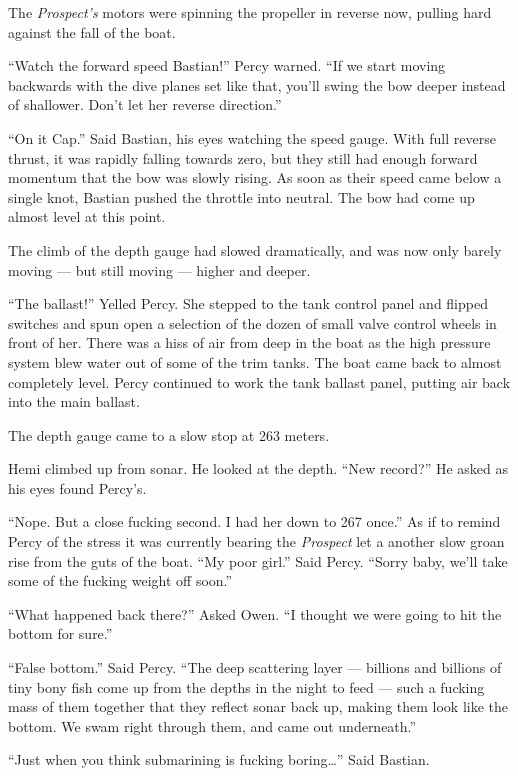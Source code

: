 \documentclass[]{scrbook}
\begin{document}
The \emph{Prospect's} motors were spinning the propeller in reverse now,
pulling hard against the fall of the boat.

``Watch the forward speed Bastian!'' Percy warned. ``If we start moving
backwards with the dive planes set like that, you'll swing the bow
deeper instead of shallower. Don't let her reverse direction.''

``On it Cap.'' Said Bastian, his eyes watching the speed gauge. With
full reverse thrust, it was rapidly falling towards zero, but they still
had enough forward momentum that the bow was slowly rising. As soon as
their speed came below a single knot, Bastian pushed the throttle into
neutral. The bow had come up almost level at this point.

The climb of the depth gauge had slowed dramatically, and was now only
barely moving --- but still moving --- higher and deeper.

``The ballast!'' Yelled Percy. She stepped to the tank control panel and
flipped switches and spun open a selection of the dozen of small valve
control wheels in front of her. There was a hiss of air from deep in the
boat as the high pressure system blew water out of some of the trim
tanks. The boat came back to almost completely level. Percy continued to
work the tank ballast panel, putting air back into the main ballast.

The depth gauge came to a slow stop at 263 meters.

Hemi climbed up from sonar. He looked at the depth. ``New record?'' He
asked as his eyes found Percy's.

``Nope. But a close fucking second. I had her down to 267 once.'' As if
to remind Percy of the stress it was currently bearing the
\emph{Prospect} let a another slow groan rise from the guts of the boat.
``My poor girl.'' Said Percy. ``Sorry baby, we'll take some of the
fucking weight off soon.''

``What happened back there?'' Asked Owen. ``I thought we were going to
hit the bottom for sure.''

``False bottom.'' Said Percy. ``The deep scattering layer --- billions
and billions of tiny bony fish come up from the depths in the night to
feed --- such a fucking mass of them together that they reflect sonar
back up, making them look like the bottom. We swam right through them,
and came out underneath.''

``Just when you think submarining is fucking boring\ldots{}'' Said
Bastian.
\end{document}
